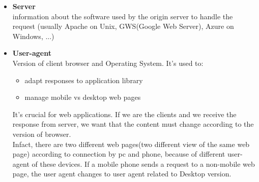 \begin{itemize}
{It was added with the born of economy services related to web pages.}
\item{\textbf{Server}\\
information about the software used by the origin server to handle the request (usually Apache on Unix, GWS(Google Web Server), Azure on Windows, ...)}
\item{\textbf{User-agent}\\
Version of client browser and Operating System. It's used to:
\begin{itemize}
\item{adapt responses to application library}
\item{manage mobile vs desktop web pages}
\end{itemize}
It's crucial for web applications. If we are the clients and we receive the response from server, we want that the content must change according to the version of browser. \\
Infact, there are two different web pages(two different view of the same web page) according to connection by pc and phone, because of different user-agent of these devices. If a mobile phone sends a request to a non-mobile web page, the user agent changes to user agent related to Desktop version.}\\
\end{itemize}

